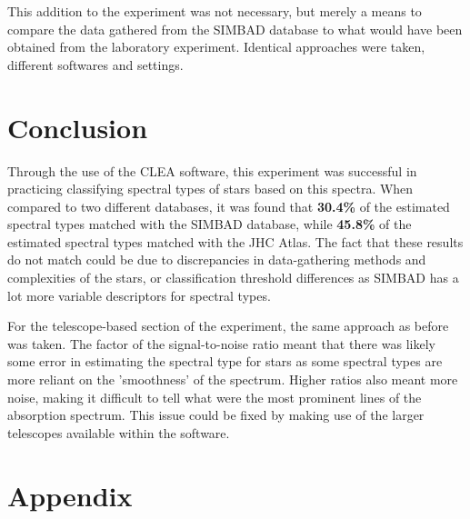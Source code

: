 \documentclass[12pt]{article}
\begin{document}
This addition to the experiment was not necessary, but merely a means to compare the data gathered from the SIMBAD database to what would have been obtained
from the laboratory experiment. Identical approaches were taken, different softwares and settings. 

\newpage

\section{Conclusion} \label{sec:4}

Through the use of the CLEA software, this experiment was successful in practicing classifying spectral types of stars based on this spectra. When compared to two different
databases, it was found that \textbf{30.4\%} of the estimated spectral types matched with the SIMBAD database, while \textbf{45.8\%} of the estimated spectral
types matched with the JHC Atlas. The fact that these results do not match could be due to discrepancies in data-gathering methods and complexities of the stars, or classification threshold differences as
SIMBAD has a lot more variable descriptors for spectral types.

For the telescope-based section of the experiment, the same approach as before was taken. The factor of the signal-to-noise ratio meant that there was likely some
error in estimating the spectral type for stars as some spectral types are more reliant on the 'smoothness' of the spectrum. Higher ratios also meant more noise, making it difficult to tell
what were the most prominent lines of the absorption spectrum. This issue could be fixed by making use of the larger telescopes available within the software.

\newpage



{\footnotesize} \label{sec:ref}

\vspace{1.5cm}

\listoffigures

\listoftables

\vspace{2.5cm}

\section*{Appendix} \label{sec:A}
\end{document}
